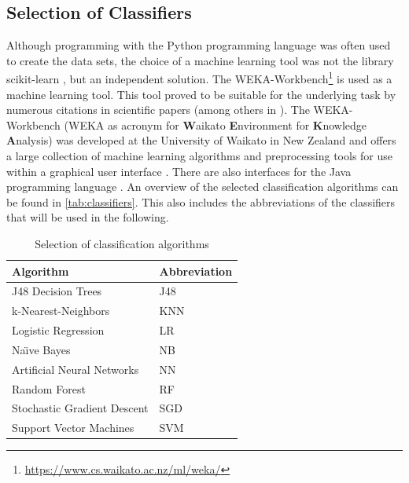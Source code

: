 \subsection{Selection of Classifiers}

Although programming with the Python programming language was often used to create the data sets, the choice of a machine learning tool was not the library scikit-learn \cite{scikit}, but an independent solution. The WEKA-Workbench\footnote{\href{https://www.cs.waikato.ac.nz/ml/weka/}{https://www.cs.waikato.ac.nz/ml/weka/}} is used as a machine learning tool. This tool proved to be suitable for the underlying task by numerous citations in scientific papers (among others in \cite{Hammouri2018,Queiroz2016,Ratzinger2008}). The WEKA-Workbench (WEKA as acronym for \textbf{W}aikato \textbf{E}nvironment for \textbf{K}nowledge \textbf{A}nalysis) was developed at the University of Waikato in New Zealand and offers a large collection of machine learning algorithms and preprocessing tools for use within a graphical user interface \cite{Weka2016}. There are also interfaces for the Java programming language \cite{Weka2016}. An overview of the selected classification algorithms can be found in \autoref{tab:classifiers}. This also includes the abbreviations of the classifiers that will be used in the following.

\begin{table}[ht]
\centering
\caption{Selection of classification algorithms}
\label{tab:classifiers}
\begin{tabular}{|l|l|} 
\hline
 \textbf{Algorithm}         & \textbf{Abbreviation}   \\ 
\hline
J48 Decision Trees          & J48                     \\ 
\hline
k-Nearest-Neighbors         & KNN                     \\ 
\hline
Logistic Regression         & LR                      \\ 
\hline
Na\"{\i}ve Bayes                  & NB                      \\ 
\hline
Artificial Neural Networks  & NN                      \\ 
\hline
Random Forest               & RF                      \\ 
\hline
Stochastic Gradient Descent & SGD                     \\ 
\hline
Support Vector Machines     & SVM                     \\
\hline
\end{tabular}
\end{table}

